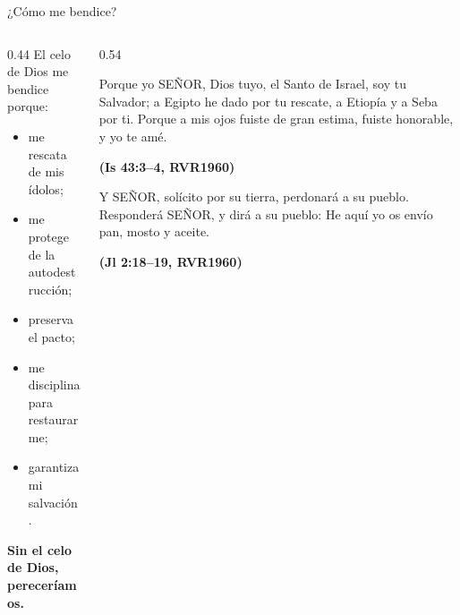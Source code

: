 \documentclass[hyperref={bookmarks=false},aspectratio=169]{beamer}
\newcommand{\SENOR}{S{\fontsize{0.78em}{1em}\selectfont EÑOR}}
\newcommand{\fuente}[1]{\par\hfill{\upshape\bfseries\footnotesize\textcolor{azul}{#1}}}
\newcommand{\destacar}[1]{\textbf{\textcolor{azul}{#1}}}
\begin{document}
\begin{frame}{¿Cómo me bendice?}
\begin{columns}[t,onlytextwidth]
\begin{column}{0.44\textwidth}\small
El celo de Dios me bendice porque:
\begin{itemize}
\item me rescata de mis ídolos;
\item me protege de la autodestrucción;
\item preserva el pacto;
\item me disciplina para restaurarme;
\item garantiza mi salvación.
\end{itemize}
\begin{center}\destacar{Sin el celo de Dios, pereceríamos.}\end{center}
\end{column}
\begin{column}{0.54\textwidth}
\begin{cita}Porque yo \SENOR, Dios tuyo, el Santo de Israel, soy tu Salvador; a Egipto he dado por tu rescate, a Etiopía y a Seba por ti. Porque a mis ojos fuiste de gran estima, fuiste honorable, y yo te amé.\fuente{(Is 43:3--4, RVR1960)}\end{cita}
\begin{cita}Y \SENOR, solícito por su tierra, perdonará a su pueblo. Responderá \SENOR, y dirá a su pueblo: He aquí yo os envío pan, mosto y aceite.\fuente{(Jl 2:18--19, RVR1960)}\end{cita}
\end{column}
\end{columns}
\end{frame}
\end{document}
